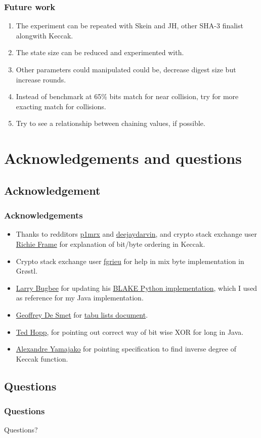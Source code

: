 \documentclass{beamer}
\begin{document}
\begin{frame}
\frametitle{Future work}
\begin{enumerate}
\item The experiment can be repeated with Skein and JH, other SHA-3 finalist alongwith Keccak.
\item The state size can be reduced and experimented with.
\item Other parameters could manipulated could be, decrease digest size but increase rounds.
\item Instead of benchmark at 65\% bits match for near collision, try for more exacting match
for collisions.
\item Try to see a relationship between chaining values, if possible.
\end{enumerate}
\end{frame}

\section{Acknowledgements and questions}

\subsection{Acknowledgement}

\begin{frame}
\frametitle{Acknowledgements}
\begin{itemize}
\item Thanks to redditors \href{"http://www.reddit.com/user/p1mrx"}{p1mrx} and 
\href{"http://www.reddit.com/user/deejaydarvin"}{deejaydarvin}, and crypto stack exchange user 
\href{"http://crypto.stackexchange.com/users/8050/richie-frame"}{Richie Frame} for explanation of bit/byte 
ordering in Keccak.
\item Crypto stack exchange user \href{"http://crypto.stackexchange.com/users/555/fgrieu"}{fgrieu} for help
in mix byte implementation in Gr{\o}stl.
\item \href{"http://www.seanet.com/~bugbee"}{Larry Bugbee} for updating his 
\href{http://www.seanet.com/~bugbee/crypto/blake/}{BLAKE Python implementation}, which I used as reference 
for my Java implementation.
\item \href{"http://stackoverflow.com/users/472109/geoffrey-de-smet"}{Geoffrey De Smet} for 
\href{"http://docs.jboss.org/drools/release/latest/optaplanner-docs/html\_single/index.html\#tabuSearch"}
{tabu lists document}.
\item \href{"http://stackoverflow.com/users/535871/ted-hopp"}{Ted Hopp}, for pointing out correct way
of bit wise XOR for long in Java.
\item \href{"http://crypto.stackexchange.com/users/4136/alexandre-yamajako"}{Alexandre Yamajako} for pointing
specification to find inverse degree of Keccak function.
\end{itemize}
\end{frame}

\subsection{Questions}

\begin{frame}
\frametitle{Questions}
Questions?
\end{frame}
\end{document}
